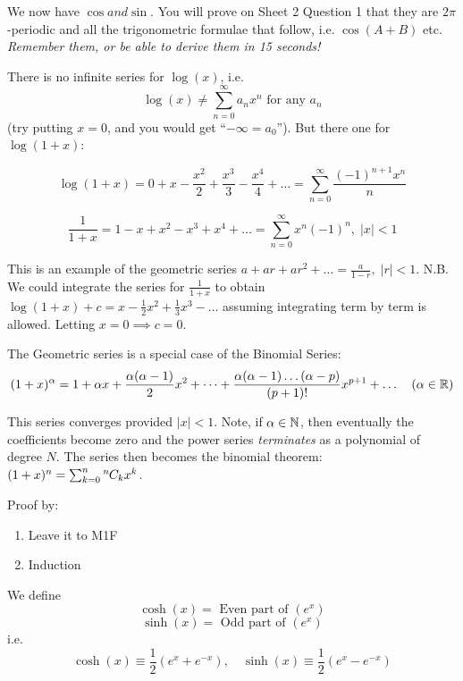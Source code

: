 \documentclass[10pt]{scrartcl}
\newcommand*{\permcomb}[4][0mu]{{{}^{#3}\mkern#1#2_{#4}}}
\newcommand*{\comb}[1][-1mu]{\permcomb[#1]{C}}
\begin{document}
We now have $\cos and \sin$. You will prove on Sheet 2 Question 1 that they are $2\pi$-periodic and all the trigonometric formulae that follow, i.e. $\cos(A+B)$ etc. \textit{Remember them, or be able to derive them in 15 seconds!}




There is no infinite series for $\log(x)$, i.e.
\[\log(x) \neq \displaystyle{\sum_{n=0}^{\infty} a_n x^n}\text{ for any }a_n\] (try putting $x=0$, and you would get ``$-\infty = a_0$''). But there one for $\log(1+x)$: 

\[\displaystyle{\log(1+x) = 0 + x - \frac{x^2}{2} + \frac{x^3}{3} - \frac{x^4}{4} + \dots = \sum_{n=0}^{\infty} \frac{(-1)^{n+1}x^n}{n} }\]

\[\displaystyle{\frac{1}{1+x} = 1 - x + x^2 - x^3 + x^4 + \dots = \sum_{n=0}^{\infty} x^n(-1)^n, \; |x| < 1 }\]

This is an example of the geometric series $a + ar + ar^2 + \dots = \frac{a}{1-r}, \; |r|<1$. N.B. We could integrate the series for $\frac{1}{1+x}$ to obtain $\log(1+x) + c = x - \frac{1}{2}x^2 + \frac{1}{3}x^3 - \dots$ assuming integrating term by term is allowed. Letting $x = 0 \implies c = 0$. 

The Geometric series is a special case of the Binomial Series:
\[\displaystyle{(1+x)^{\alpha} = 1 + \alpha x + \frac{\alpha(\alpha -1)}{2}x^2 + \dots + \frac{\alpha(\alpha-1)\dots(\alpha-p)}{(p+1)!}x^{p+1} + \dots \quad (\alpha \in \mathbb{R}) }\]

This series converges provided $|x|<1$. Note, if $\alpha \in \mathbb{N}$, then eventually the coefficients become zero and the power series \emph{terminates} as a polynomial of degree $N$. The series then becomes the binomial theorem: $(1+x)^n = \sum_{k=0}^{n} \comb{n}{k} x^k$.

Proof by: 
\begin{enumerate}
\item Leave it to M1F
\item Induction
\end{enumerate}

\vspace*{5pt}

\begin{definition}
We define 
\[\cosh(x) = \text{ Even part of } (e^x)\]	
\[\sinh(x) = \text{ Odd part of } (e^x)\]	
i.e. 
\[
  \cosh(x) \equiv \frac{1}{2}(e^x + e^{-x}),\quad
  \sinh(x) \equiv \frac{1}{2}(e^x - e^{-x})
\]
\end{definition}
\end{document}
